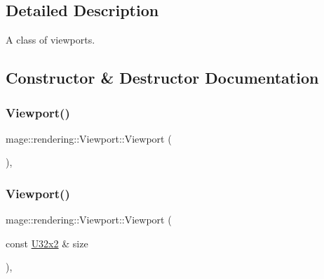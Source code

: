 \subsection{Detailed Description}
A class of viewports. 

\subsection{Constructor \& Destructor Documentation}
\hypertarget{classmage_1_1rendering_1_1_viewport_a93c3a23a87fb30301ab9f400bd2c128a}{}\label{classmage_1_1rendering_1_1_viewport_a93c3a23a87fb30301ab9f400bd2c128a} 
\subsubsection{\texorpdfstring{Viewport()}{Viewport()}\hspace{0.1cm}{\footnotesize\ttfamily [1/7]}}
{\footnotesize\ttfamily mage\+::rendering\+::\+Viewport\+::\+Viewport (\begin{DoxyParamCaption}{ }\end{DoxyParamCaption})\hspace{0.3cm}{\ttfamily [explicit]}, {\ttfamily [noexcept]}}

\hypertarget{classmage_1_1rendering_1_1_viewport_a965fca01823d89e1c1f22cf55aa1ffda}{}\label{classmage_1_1rendering_1_1_viewport_a965fca01823d89e1c1f22cf55aa1ffda} 
\subsubsection{\texorpdfstring{Viewport()}{Viewport()}\hspace{0.1cm}{\footnotesize\ttfamily [2/7]}}
{\footnotesize\ttfamily mage\+::rendering\+::\+Viewport\+::\+Viewport (\begin{DoxyParamCaption}\item[{const \hyperlink{namespacemage_a88e05bff0300120c013285d3dcad95c5}{U32x2} \&}]{size }\end{DoxyParamCaption})\hspace{0.3cm}{\ttfamily [explicit]}, {\ttfamily [noexcept]}}

\hypertarget{classmage_1_1rendering_1_1_viewport_aeac9a1936b174664131468b63f6775da}{}\label{classmage_1_1rendering_1_1_viewport_aeac9a1936b174664131468b63f6775da} 
